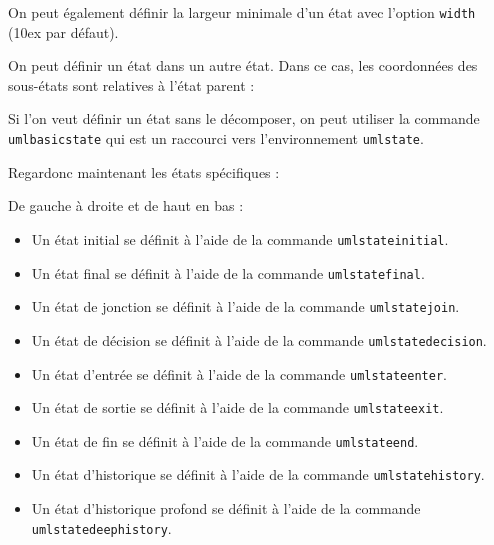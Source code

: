 \documentclass[a4paper,11pt]{report}
\newcommand{\inputTikZ}[1]{%
  }%
\newcommand{\inputTikZ}[1]{%
    \texttt{[image: fig/\#1.pdf]}%
  }%
\begin{document}
\medskip

On peut également définir la largeur minimale d'un état avec l'option {\tt width} (10ex par défaut).

\medskip

On peut définir un état dans un autre état. Dans ce cas, les coordonnées des sous-états sont relatives à l'état parent :

\medskip

\begin{minipage}{0.51\textwidth}

\end{minipage}
\begin{minipage}{0.49\textwidth}
\begin{center}
\inputTikZ{figure52}
\end{center}
\end{minipage}

\medskip

Si l'on veut définir un état sans le décomposer, on peut utiliser la commande {\tt umlbasicstate} qui est un raccourci vers l'environnement {\tt umlstate}.

\medskip

Regardonc maintenant les états spécifiques :

\medskip

\begin{minipage}{0.51\textwidth}

\end{minipage}
\begin{minipage}{0.49\textwidth}
\begin{center}
\inputTikZ{figure53}
\end{center}
\end{minipage}

\medskip

De gauche à droite et de haut en bas :

\medskip

\begin{itemize}
\item Un état initial se définit à l'aide de la commande {\tt umlstateinitial}.
\item Un état final se définit à l'aide de la commande {\tt umlstatefinal}.
\item Un état de jonction se définit à l'aide de la commande {\tt umlstatejoin}.
\item Un état de décision se définit à l'aide de la commande {\tt umlstatedecision}.
\item Un état d'entrée se définit à l'aide de la commande {\tt umlstateenter}.
\item Un état de sortie se définit à l'aide de la commande {\tt umlstateexit}.
\item Un état de fin se définit à l'aide de la commande {\tt umlstateend}.
\item Un état d'historique se définit à l'aide de la commande {\tt umlstatehistory}.
\item Un état d'historique profond se définit à l'aide de la commande {\tt umlstatedeephistory}.
\end{itemize}
\end{document}
